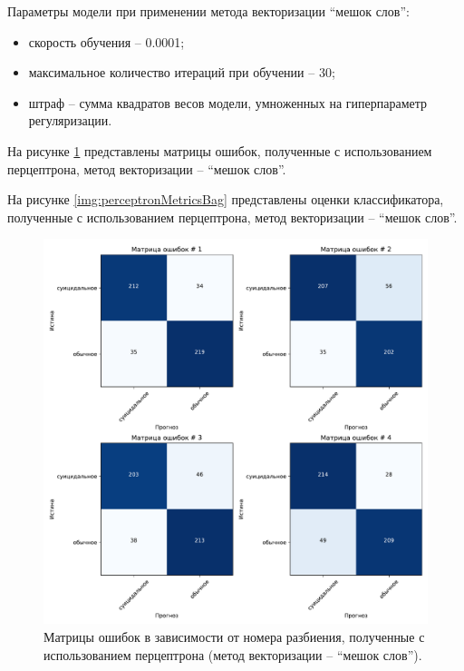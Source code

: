 Параметры модели при применении метода векторизации ``мешок слов'':
\begin{itemize}
	\item скорость обучения -- 0.0001;
	\item максимальное количество итераций при обучении -- 30;
	\item штраф -- сумма квадратов весов модели, умноженных на гиперпараметр регуляризации.
\end{itemize}

На рисунке \ref{img:perceptronMatrBag} представлены матрицы ошибок, полученные с использованием перцептрона, метод векторизации -- ``мешок слов''.

На рисунке \ref{img:perceptronMetricsBag} представлены оценки классификатора, полученные с использованием перцептрона, метод векторизации -- ``мешок слов''.

\begin{figure}[H]
	\centering
	\includegraphics[width=\textwidth]{inc/plots/perceptronMatrBag.pdf}
	\caption{ Матрицы ошибок в зависимости от номера разбиения, полученные с использованием перцептрона (метод векторизации -- ``мешок слов''). }
	\label{img:perceptronMatrBag}
\end{figure}

